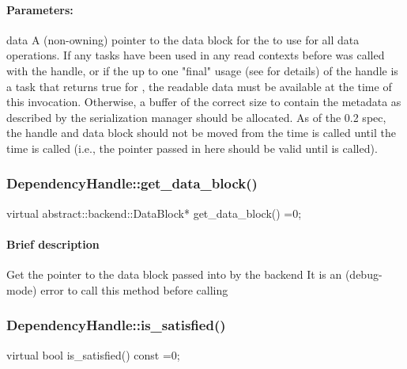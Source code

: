 \paragraph{Parameters:} 
\begin{compactdesc}
\item[data] A (non-owning) pointer to the data block for the  to use for
       all data operations.  If any tasks have been used in any read contexts before
        was called with the handle, or if the up to one
       "final" usage (see  for details) of the handle is a task
       that returns true for , the readable data must be available
       at the time of this invocation.  Otherwise, a buffer of the correct size to contain
       the metadata as described by the serialization manager should be allocated.  As of
       the 0.2 spec, the handle and data block should not be moved from the time
        is called until the time  is called
       (i.e., the pointer passed in here should be valid until  is called).
\end{compactdesc}

\subsubsection{DependencyHandle::get\_data\_block()}
\begin{CppCode}
    virtual abstract::backend::DataBlock*
    get_data_block() =0;
\end{CppCode}

\paragraph{Brief description} Get the pointer to the data block passed into  by the backend
       It is an (debug-mode) error to call this method before calling 


\subsubsection{DependencyHandle::is\_satisfied()}
\begin{CppCode}
    virtual bool
    is_satisfied() const =0;
\end{CppCode}

